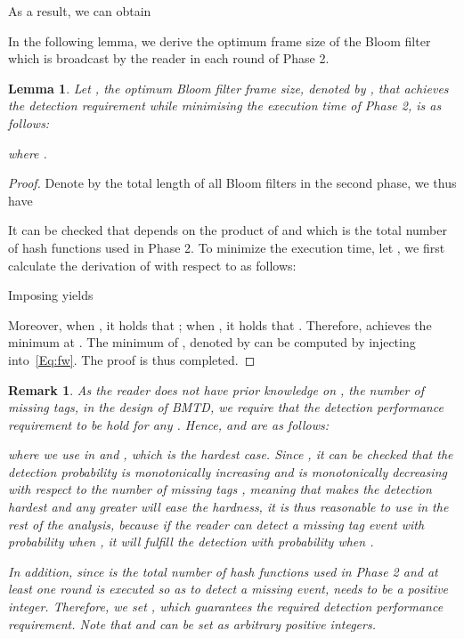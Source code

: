 \documentclass[10pt, twocolumn]{IEEEtran}
\newtheorem{lemma}{Lemma}
\newtheorem*{remark}{Remark}
\begin{document}
As a result, we can obtain


In the following lemma, we derive the optimum frame size of the Bloom filter  which is broadcast by the reader in each round of Phase 2.
\begin{lemma}
\label{Lem:Par_II}
Let , the optimum Bloom filter frame size, denoted by , that achieves the detection requirement while minimising the execution time of Phase 2, is as follows:

where .
\end{lemma}
\begin{proof}
Denote by  the total length of all  Bloom filters in the second phase, we thus have

It can be checked that  depends on the product of  and  which is the total number of hash functions used in Phase 2.
To minimize the execution time, let , we first calculate the derivation of  with respect to  as follows:

Imposing  yields

Moreover, when , it holds that ; when , it holds that . Therefore,  achieves the minimum at . The minimum of , denoted by  can be computed by injecting  into~\eqref{Eq:fw}. The proof is thus completed.
\end{proof}

\begin{remark}

As the reader does not have prior knowledge on , the number of missing tags, in the design of BMTD, we require that the detection performance requirement to be hold for any . Hence,  and  are as follows:

where we use  in  and , which is the hardest case.
Since , it can be checked that the detection probability  is monotonically increasing and  is monotonically decreasing with respect to the number of missing tags , meaning that  makes the detection hardest and any greater  will ease the hardness, it is thus reasonable to use  in the rest of the analysis, because if the reader can detect a missing tag event with probability  when , it will fulfill the detection with probability  when .

In addition, since  is the total number of hash functions used in Phase 2 and at least one round is executed so as to detect a missing event,  needs to be a positive integer. Therefore, we set , which guarantees the required detection performance requirement.
Note that  and  can be set as arbitrary positive integers.
\end{remark}
\end{document}
